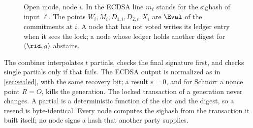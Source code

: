 \begin{figure}[t]
\centering
{}
\caption{Open mode, node $i$. In the ECDSA line $m_\ell$ stands for the sighash of input $\ell$. The points $W_i, M_i, D_{1,i}, D_{2,i}, X_i$ are $\Eval$ of the commitments at $i$. A node that has not voted writes its ledger entry when it sees the lock; a node whose ledger holds another digest for $(\rid, g)$ abstains.}
\label{fig:open}
\end{figure}

The combiner interpolates $t$ partials, checks the final signature first, and checks single partials only if that fails. The ECDSA output is normalized as in \cref{sec:sealed}, with the same recovery bit; a result $s = 0$, and for Schnorr a nonce point $R = O$, kills the generation. The locked transaction of a generation never changes. A partial is a deterministic function of the slot and the digest, so a resend is byte-identical. Every node computes the sighash from the transaction it built itself; no node signs a hash that another party supplies.

